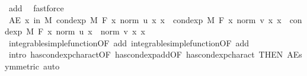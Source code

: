 \begin{isabellebody}
\ add{\isacharparenleft}{\kern0pt}{}{\isacharcomma}{\kern0pt}{}{\isacharparenright}{\kern0pt}\ \isamarkupfalse%
\ fastforce\isanewline
\ \ \isamarkupfalse%
\ \isamarkupfalse%
\ {\isachardoublequoteopen}AE\ x\ in\ M{\isachardot}{\kern0pt}\ cond{\isacharunderscore}{\kern0pt}exp\ M\ F\ {\isacharparenleft}{\kern0pt}{\isasymlambda}x{\isachardot}{\kern0pt}\ norm\ {\isacharparenleft}{\kern0pt}u\ x{\isacharparenright}{\kern0pt}{\isacharparenright}{\kern0pt}\ x\ {\isacharplus}{\kern0pt}\ cond{\isacharunderscore}{\kern0pt}exp\ M\ F\ {\isacharparenleft}{\kern0pt}{\isasymlambda}x{\isachardot}{\kern0pt}\ norm\ {\isacharparenleft}{\kern0pt}v\ x{\isacharparenright}{\kern0pt}{\isacharparenright}{\kern0pt}\ x\ {\isacharequal}{\kern0pt}\ cond{\isacharunderscore}{\kern0pt}exp\ M\ F\ {\isacharparenleft}{\kern0pt}{\isasymlambda}x{\isachardot}{\kern0pt}\ norm\ {\isacharparenleft}{\kern0pt}u\ x{\isacharparenright}{\kern0pt}\ {\isacharplus}{\kern0pt}\ norm\ {\isacharparenleft}{\kern0pt}v\ x{\isacharparenright}{\kern0pt}{\isacharparenright}{\kern0pt}\ x{\isachardoublequoteclose}\ \isamarkupfalse%
\ integrable{\isacharunderscore}{\kern0pt}simple{\isacharunderscore}{\kern0pt}function{\isacharbrackleft}{\kern0pt}OF\ add{\isacharparenleft}{\kern0pt}{}{\isacharcomma}{\kern0pt}{}{\isacharparenright}{\kern0pt}{\isacharbrackright}{\kern0pt}\ integrable{\isacharunderscore}{\kern0pt}simple{\isacharunderscore}{\kern0pt}function{\isacharbrackleft}{\kern0pt}OF\ add{\isacharparenleft}{\kern0pt}{}{\isacharcomma}{\kern0pt}{}{\isacharparenright}{\kern0pt}{\isacharbrackright}{\kern0pt}\ \isamarkupfalse%
\ {\isacharparenleft}{\kern0pt}intro\ has{\isacharunderscore}{\kern0pt}cond{\isacharunderscore}{\kern0pt}exp{\isacharunderscore}{\kern0pt}charact{\isacharparenleft}{\kern0pt}{}{\isacharparenright}{\kern0pt}{\isacharbrackleft}{\kern0pt}OF\ has{\isacharunderscore}{\kern0pt}cond{\isacharunderscore}{\kern0pt}exp{\isacharunderscore}{\kern0pt}add{\isacharbrackleft}{\kern0pt}OF\ has{\isacharunderscore}{\kern0pt}cond{\isacharunderscore}{\kern0pt}exp{\isacharunderscore}{\kern0pt}charact{\isacharparenleft}{\kern0pt}{}{\isacharcomma}{\kern0pt}{}{\isacharparenright}{\kern0pt}{\isacharbrackright}{\kern0pt}{\isacharcomma}{\kern0pt}\ THEN\ AE{\isacharunderscore}{\kern0pt}symmetric{\isacharbrackright}{\kern0pt}{\isacharcomma}{\kern0pt}\ auto{\isacharparenright}{\kern0pt}\isanewline
\ \ \isamarkupfalse%

\end{isabellebody}
